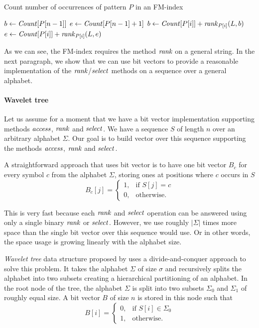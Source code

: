 \begin{algorithm}
\caption{Count number of occurrences of pattern $P$ in an FM-index}\label{alg:fm_index_count}
$b \gets \mathit{Count}[P[n-1]]$\;
$e \gets \mathit{Count}[P[n-1]+1]$\;
 {
	$b \gets \mathit{Count}[P[i]] + \mathit{rank}_{P[i]}(L, b)$\;
	$e \gets \mathit{Count}[P[i]] + \mathit{rank}_{P[i]}(L, e)$\;
}
\end{algorithm}

As we can see, the FM-index requires the method $\mathit{rank}$ on a general string. In the next
paragraph, we show that we can use bit vectors to provide a reasonable implementation of
the $\mathit{rank}$/$\mathit{select}$ methods on a sequence over a general alphabet.

\paragraph{Wavelet tree}
\label{section:WaweletTree}

Let us assume for a moment that we have a bit vector implementation supporting methods $\mathit{access}$,
$\mathit{rank}$ and $\mathit{select}$. We have a sequence $S$ of length $n$ over an arbitrary alphabet $\Sigma$.
Our goal is to build vector over this sequence supporting the methods $\mathit{access}$, $\mathit{rank}$ and $\mathit{select}$.

A straightforward approach that uses bit vector is to have one bit vector $B_c$ for every
symbol $c$ from the alphabet $\Sigma$, storing ones at positions where $c$ occurs in $S$
\[
    B_c[j]= 
\begin{cases}
	1,& \text{if } S[j]=c \\
    0,& \text{otherwise.}
\end{cases}
\]

This is very fast because each $\mathit{rank}$ and $\mathit{select}$ operation can be answered using only a single
binary $\mathit{rank}$ or $\mathit{select}$. However, we use roughly $|\Sigma|$ times more space than the single bit
vector over this sequence would use. Or in other words, the space usage is growing linearly with the
alphabet size.

\textit{Wavelet tree} data structure proposed by \cite{grossi2003high} uses a divide-and-conquer
approach to solve this problem. It takes the alphabet $\Sigma$ of size $\sigma$ and recursively
splits the alphabet into two subsets creating a hierarchical partitioning of an alphabet. In the
root node of the tree, the alphabet $\Sigma$ is split into two subsets $\Sigma_0$ and $\Sigma_1$
of roughly equal size. A bit vector $B$ of size $n$ is stored in this node such that
\[
    B[i]= 
\begin{cases}
    0,& \text{if } S[i]\in \Sigma_0\\
    1,              & \text{otherwise.}
\end{cases}
\]

